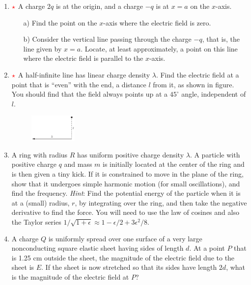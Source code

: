 \begin{enumerate}
    \item $\color{red}{\star}$ A charge $2q$ is at the origin, and a charge $-q$ is at $x=a$ on the $x$-axis.

    \begin{itemize}
        \item[a)] Find the point on the $x$-axis where the electric field is zero.
        \item[b)] Consider the vertical line passing through the charge $−q$, that is, the line given by $x=a$. Locate, at least approximately, a point on this line where the electric field is parallel to the $x$-axis.
    \end{itemize}

    \item $\color{red}{\star}$ A half-infinite line has linear charge density $\lambda$. Find the electric field at a point that is “even” with the end, a distance $l$ from it, as shown in figure. You should find that the field always points up at a $45^\circ$ angle, independent of $l$.

    \begin{figure}[H]
        \centering
        \includegraphics[width=0.22\textwidth]{figures-workshop01/problem-18.png}
    \end{figure}

    \item A ring with radius $R$ has uniform positive charge density $\lambda$. A particle with positive charge $q$ and mass $m$ is initially located at the center of the ring and is then given a tiny kick. If it is constrained to move in the plane of the ring, show that it undergoes simple harmonic motion (for small oscillations), and find the frequency. \textit{Hint}: Find the potential energy of the particle when it is at a (small) radius, $r$, by integrating over the ring, and then take the negative derivative to find the force. You will need to use the law of cosines and also the Taylor series $1/\sqrt{1+\epsilon}\approx1-\epsilon/2+3\epsilon^2/8$.

    \item A charge $Q$ is uniformly spread over one surface of a very large nonconducting square elastic sheet having sides of length $d$. At a point $P$ that is 1.25 cm outside the sheet, the magnitude of the electric field due to the sheet is $E$. If the sheet is now stretched so that its sides have length $2d$, what is the magnitude of the electric field at $P$?


\end{enumerate}
